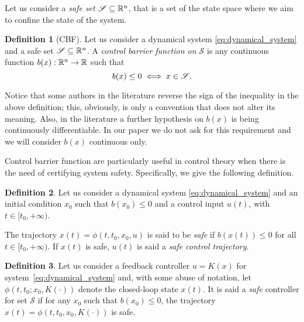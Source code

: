\documentclass[letterpaper, 10 pt, conference]{ieeeconf}
\newcounter{Definition}
\theoremstyle{definition}
\theoremstyle{nopoint}
\newtheorem{definitionNoPoint}{Definition}
\newcommand{\tildeAdd}{~}
\begin{document}
Let us consider a {\em safe set} $\mathcal{S}\subseteq \Bbb{R}^n$, that is a set of the state space where we aim to confine the state of the system. 


\begin{definitionNoPoint}[CBF]
Let us consider a dynamical system \eqref{eq:dynamical_system} and a safe set $\mathcal{S}\subseteq \Bbb{R}^n$. 
A {\em control barrier function on $\mathcal{S}$} is any continuous function $b(x): \Bbb{R}^n \rightarrow \Bbb{R}$ such that 
\begin{equation}\label{eq:barrier_function}
b(x) \leq 0 \iff x \in \mathcal{S}.\\
\end{equation}
\end{definitionNoPoint}



Notice that some authors in the literature reverse the sign of the inequality in the above definition; this, obviously, is only a convention that does not alter its meaning. Also, in the literature a further hypothesis on $b(x)$ is being continuously differentiable. In our paper we do not ask for this requirement and we will consider $b(x)$ continuous only. 




Control barrier function are particularly useful in control theory when there is the need of certifying system safety. Specifically, we give the following definition. 

\begin{definitionNoPoint}
Let us consider a dynamical system \eqref{eq:dynamical_system}
and an initial condition $x_0$ such that $b(x_0)\leq 0$ and a control input $u(t)$, with $t\in [t_0, +\infty)$. 

The trajectory $x(t)=\phi(t,t_0,x_0,u)$ is said to be {\em safe} if $b(x(t))\leq 0$ for all $t\in [t_0, +\infty)$. If $x(t)$ is safe, $u(t)$ is said a {\em safe control trajectory}.

\end{definitionNoPoint}


\begin{definitionNoPoint}
Let us consider a feedback controller \( u = K(x) \) for system\tildeAdd\eqref{eq:dynamical_system} and, with some abuse of notation, let \(\phi(t, t_0; x_0, K(\cdot))\) denote the closed-loop state \( x(t) \). It is said a {\em safe} controller for set $\mathcal{S}$ if for any $x_0$ such that $b(x_0)\leq 0$, the trajectory  $x(t)=\phi(t,t_0,x_0,K(\cdot))$ is safe.
\end{definitionNoPoint}
\end{document}
